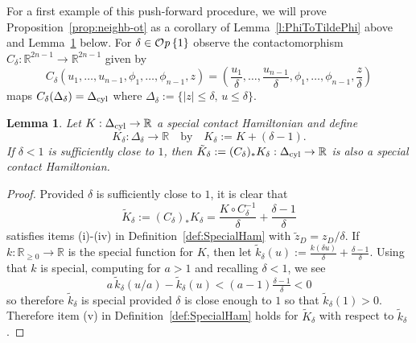 \documentclass[12pt]{paper}
\theoremstyle{plain}
\newtheorem{lemma}[theorem]{Lemma}
\theoremstyle{definition}
\newcommand{\eps}{\varepsilon}
\newcommand{\abs}[1]{\left| #1 \right|}
\newcommand{\R}{{\mathbb{R}}}
\newcommand{\cyl}{{\rm cyl}}
\def\Op{{\mathcal O}{\it p}\,}
\numberwithin{figure}{section}
\begin{document}
For a first example of this push-forward procedure, we will prove Proposition~\ref{prop:neighb-ot}
as a corollary of Lemma~\ref{l:PhiToTildePhi} above and Lemma~\ref{lem:Scale} below. %
For $\delta \in \Op \{1\}$ observe the contactomorphism $C_\delta: \R^{2n-1} \to \R^{2n-1}$ given by 
$$
	C_\delta(u_1, \dots, u_{n-1},\phi_1, \dots, \phi_{n-1}, z) = 
		\left(\frac{u_1}{\delta}, \dots, \frac{u_{n-1}}{\delta}, \phi_1, \dots, \phi_{n-1}, \frac{z}{\delta}\right)
$$
maps $C_{\delta}(\Delta_\delta) = \Delta_{\cyl}$ where $\Delta_\delta := \{\abs{z} \leq \delta,\, u \leq \delta\}$.
\begin{lemma}\label{lem:Scale}
	Let $K:\Delta_\cyl \to \R$ a special contact Hamiltonian and define
	$$
		K_{\delta}: \Delta_\delta \to \R \quad\mbox{by}\quad K_{\delta}:= K + (\delta-1).
	$$
	If $\delta < 1$ is sufficiently close to $1$, then 
	$\tilde{K}_\delta:= (C_\delta)_* K_{\delta} : \Delta_{\cyl} \to \R$ is also a special contact Hamiltonian.
\end{lemma}
\begin{proof}
	Provided $\delta$ is sufficiently close to $1$, it is clear that
	$$
		\tilde{K}_\delta := (C_\delta)_* K_{\delta} = \frac{K \circ C_\delta^{-1}}{\delta} + \frac{\delta -1}{\delta}
	$$
	satisfies items (i)-(iv) in Definition~\ref{def:SpecialHam} with 
	$\tilde{z}_D = z_D / \delta$.
	If $k: \R_{\geq 0} \to \R$ is the special function for $K$, then let 
	$\tilde{k}_\delta(u) := \tfrac{k(\delta u)}{\delta} + \tfrac{\delta-1}{\delta}$.
	Using that $k$ is special, computing for $a > 1$ and recalling $\delta < 1$, we see
	$$
		a\,\tilde{k}_\delta(u/a) -\tilde{k}_{\delta}(u)
		< (a-1)\tfrac{\delta - 1}{\delta} < 0
	$$
	so therefore $\tilde{k}_\delta$ is special provided $\delta$ is close enough to $1$ so that $\tilde{k}_\delta(1) > 0$.
	Therefore item (v)
	in Definition~\ref{def:SpecialHam} holds for $\tilde{K}_\delta$ with respect to $\tilde{k}_\delta$.
%
%	
\end{proof}
\end{document}
